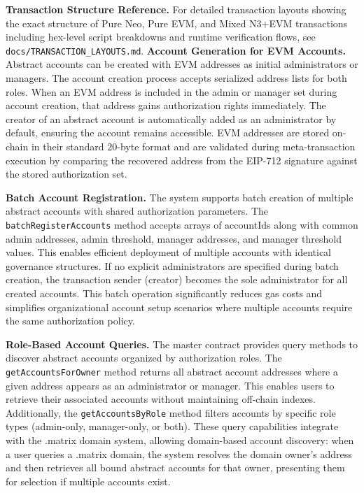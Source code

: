 \documentclass[10pt,twocolumn]{article}
\newcommand{\code}[1]{\texttt{\small #1}}
\begin{document}
\textbf{Transaction Structure Reference.} For detailed transaction layouts showing the exact structure of Pure Neo, Pure EVM, and Mixed N3+EVM transactions including hex-level script breakdowns and runtime verification flows, see \texttt{docs/TRANSACTION\_LAYOUTS.md}.
\textbf{Account Generation for EVM Accounts.} Abstract accounts can be created with EVM addresses as initial administrators or managers. The account creation process accepts serialized address lists for both roles. When an EVM address is included in the admin or manager set during account creation, that address gains authorization rights immediately. The creator of an abstract account is automatically added as an administrator by default, ensuring the account remains accessible. EVM addresses are stored on-chain in their standard 20-byte format and are validated during meta-transaction execution by comparing the recovered address from the EIP-712 signature against the stored authorization set.

\textbf{Batch Account Registration.} The system supports batch creation of multiple abstract accounts with shared authorization parameters. The \code{batchRegisterAccounts} method accepts arrays of accountIds along with common admin addresses, admin threshold, manager addresses, and manager threshold values. This enables efficient deployment of multiple accounts with identical governance structures. If no explicit administrators are specified during batch creation, the transaction sender (creator) becomes the sole administrator for all created accounts. This batch operation significantly reduces gas costs and simplifies organizational account setup scenarios where multiple accounts require the same authorization policy.

\textbf{Role-Based Account Queries.} The master contract provides query methods to discover abstract accounts organized by authorization roles. The \code{getAccountsForOwner} method returns all abstract account addresses where a given address appears as an administrator or manager. This enables users to retrieve their associated accounts without maintaining off-chain indexes. Additionally, the \code{getAccountsByRole} method filters accounts by specific role types (admin-only, manager-only, or both). These query capabilities integrate with the .matrix domain system, allowing domain-based account discovery: when a user queries a .matrix domain, the system resolves the domain owner's address and then retrieves all bound abstract accounts for that owner, presenting them for selection if multiple accounts exist.
\end{document}
